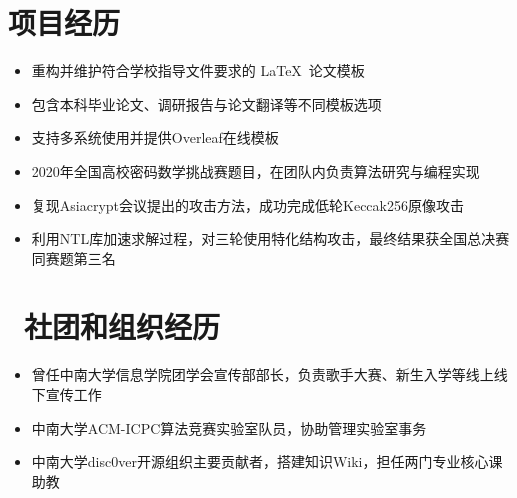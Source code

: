 \documentclass{resume}
\begin{document}
\section{\faCogs 项目经历}
\begin{itemize}
    \item 重构并维护符合学校指导文件要求的 \LaTeX\ 论文模板
    \item 包含本科毕业论文、调研报告与论文翻译等不同模板选项
    \item 支持多系统使用并提供Overleaf在线模板
\end{itemize}

\begin{itemize}
  \item 2020年全国高校密码数学挑战赛题目，在团队内负责算法研究与编程实现
  \item 复现Asiacrypt会议提出的攻击方法，成功完成低轮Keccak256原像攻击
  \item 利用NTL库加速求解过程，对三轮使用特化结构攻击，最终结果获全国总决赛同赛题第三名
\end{itemize}


\section{\faUsers\ 社团和组织经历}
\begin{itemize}
    \item 曾任中南大学信息学院团学会宣传部部长，负责歌手大赛、新生入学等线上线下宣传工作
    \item 中南大学ACM-ICPC算法竞赛实验室队员，协助管理实验室事务
    \item 中南大学disc0ver开源组织主要贡献者，搭建知识Wiki，担任两门专业核心课助教
    
\end{itemize}
\end{document}
